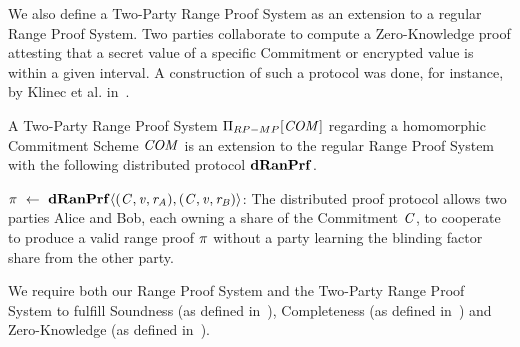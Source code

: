 We also define a Two-Party Range Proof System as an extension to a regular Range Proof System.
Two parties collaborate to compute a Zero-Knowledge proof attesting that a secret value of a specific Commitment or encrypted value is within a given interval.
A construction of such a protocol was done, for instance, by Klinec et al. in~\cite{klinec2020privacy}.

\begin{definition}\label{def:pre:mp-rangeproof}
    A Two-Party Range Proof System $\Pi_{RP-MP}[\mathit{COM}]$ regarding a homomorphic Commitment Scheme $\mathit{COM}$ is an extension to the regular Range Proof System with the following
    distributed protocol $\mathbf{dRanPrf}$.
    \begin{asparaitem}
        \item $\pi ~\leftarrow~ \mathbf{dRanPrf} \langle (\mathit{C},\mathit{v},\mathit{r}_{\mathit{A}}),(\mathit{C},\mathit{v},\mathit{r}_{\mathit{B}}) \rangle$: The distributed proof protocol allows two parties Alice and Bob, each owning a share of the
        Commitment $\mathit{C}$, to cooperate to produce a valid range proof $\pi$ without a party learning the blinding factor share from the other party.
    \end{asparaitem}
\end{definition}

We require both our Range Proof System and the Two-Party Range Proof System to fulfill Soundness (as defined in~\cite{morais2019survey}), Completeness (as defined in~\cite{morais2019survey}) and Zero-Knowledge (as defined in~\cite{fuchsbauer2019aggregate}).
